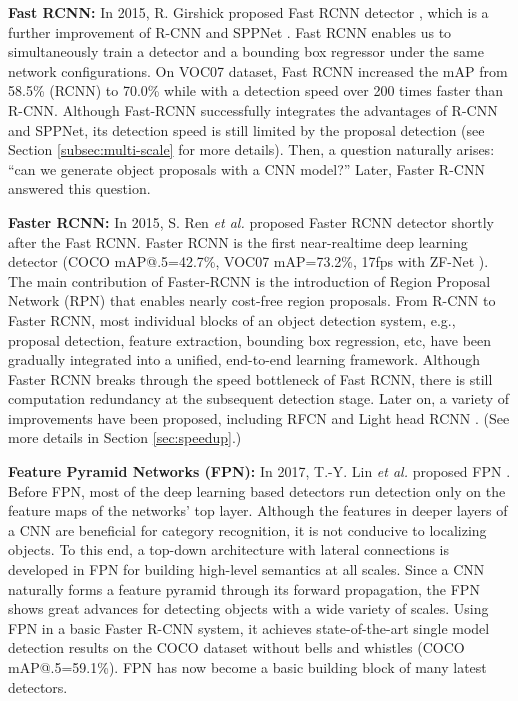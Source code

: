 \documentclass[lettersize,journal]{IEEEtran}
\begin{document}
\textbf{Fast RCNN:}
In 2015, R. Girshick proposed Fast RCNN detector \cite{ICCV15-FastRCNN}, which is a further improvement of R-CNN and SPPNet \cite{CVPR14-RCNN, ECCV14-SPPNet}. Fast RCNN enables us to simultaneously train a detector and a bounding box regressor under the same network configurations. On VOC07 dataset, Fast RCNN increased the mAP from 58.5\% (RCNN) to 70.0\% while with a detection speed over 200 times faster than R-CNN. Although Fast-RCNN successfully integrates the advantages of R-CNN and SPPNet, its detection speed is still limited by the proposal detection (see Section \ref{subsec:multi-scale} for more details). Then, a question naturally arises: ``can we generate object proposals with a CNN model?'' Later, Faster R-CNN \cite{NIPS15-FasterRCNN} answered this question.

\textbf{Faster RCNN:}
In 2015, S. Ren \emph{et al.} proposed Faster RCNN detector \cite{NIPS15-FasterRCNN, TPAMI17-FasterRCNN} shortly after the Fast RCNN. Faster RCNN is the first near-realtime deep learning detector (COCO mAP@.5=42.7\%, 
VOC07 mAP=73.2\%,
17fps with ZF-Net \cite{ECCV14-VisCNN}). The main contribution of Faster-RCNN is the introduction of Region Proposal Network (RPN) that enables nearly cost-free region proposals. From R-CNN to Faster RCNN, most individual blocks of an object detection system, e.g., proposal detection, feature extraction, bounding box regression, etc, have been gradually integrated into a unified, end-to-end learning framework. Although Faster RCNN breaks through the speed bottleneck of Fast RCNN, there is still computation redundancy at the subsequent detection stage. Later on, a variety of improvements have been proposed, including RFCN \cite{NIPS16-RFCN} and Light head RCNN \cite{CVPR18-LightHead}. (See more details in Section \ref{sec:speedup}.)

\textbf{Feature Pyramid Networks (FPN):}
In 2017, T.-Y. Lin \emph{et al.} proposed FPN \cite{CVPR17-FPN}. Before FPN, most of the deep learning based detectors run detection only on the feature maps of the networks' top layer. Although the features in deeper layers of a CNN are beneficial for category recognition, it is not conducive to localizing objects. To this end, a top-down architecture with lateral connections is developed in FPN for building high-level semantics at all scales. Since a CNN naturally forms a feature pyramid through its forward propagation, the FPN shows great advances for detecting objects with a wide variety of scales. Using FPN in a basic Faster R-CNN system, it achieves state-of-the-art single model detection results on the COCO dataset without bells and whistles (COCO mAP@.5=59.1\%).
FPN has now become a basic building block of many latest detectors.
\end{document}
